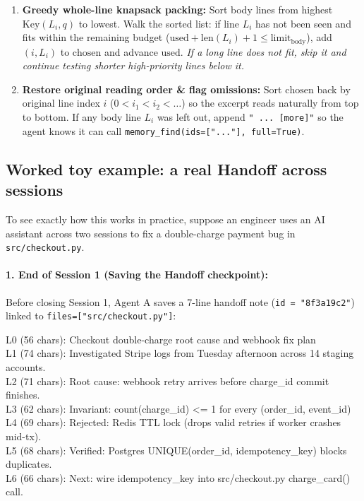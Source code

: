 \documentclass[11pt,a4paper]{article}
\begin{document}
\begin{mathbox}
\begin{enumerate}[leftmargin=1.5em,itemsep=3pt]
\begin{itemize}[leftmargin=1.2em,itemsep=1pt]
  \end{itemize}
  \item \textbf{Greedy whole-line knapsack packing:} Sort body lines from highest $\text{Key}(L_i, q)$ to lowest. Walk the sorted list: if line $L_i$ has not been seen and fits within the remaining budget ($\text{used} + \text{len}(L_i) + 1 \le \text{limit}_{\text{body}}$), add $(i, L_i)$ to $\text{chosen}$ and advance $\text{used}$. \emph{If a long line does not fit, skip it and continue testing shorter high-priority lines below it.}
  \item \textbf{Restore original reading order \& flag omissions:} Sort $\text{chosen}$ back by original line index $i$ ($0 < i_1 < i_2 < \dots$) so the excerpt reads naturally from top to bottom. If any body line $L_i$ was left out, append \texttt{" ... [more]"} so the agent knows it can call \texttt{memory\_find(ids=["..."], full=True)}.
\end{enumerate}
\end{mathbox}

\subsection{Worked toy example: a real Handoff across sessions}

To see exactly how this works in practice, suppose an engineer uses an AI assistant across two sessions to fix a double-charge payment bug in \texttt{src/checkout.py}.

\paragraph{1. End of Session 1 (Saving the Handoff checkpoint):}
Before closing Session 1, Agent A saves a 7-line handoff note (\texttt{id = "8f3a19c2"}) linked to \texttt{files=["src/checkout.py"]}:

\begin{tcolorbox}[colback=codebg,colframe=gray!40,boxrule=0.5pt,arc=3pt,fontupper=\ttfamily\scriptsize]
L0 (56 chars): Checkout double-charge root cause and webhook fix plan\\
L1 (74 chars): Investigated Stripe logs from Tuesday afternoon across 14 staging accounts.\\
L2 (71 chars): Root cause: webhook retry arrives before charge\_id commit finishes.\\
L3 (62 chars): Invariant: count(charge\_id) <= 1 for every (order\_id, event\_id)\\
L4 (69 chars): Rejected: Redis TTL lock (drops valid retries if worker crashes mid-tx).\\
L5 (68 chars): Verified: Postgres UNIQUE(order\_id, idempotency\_key) blocks duplicates.\\
L6 (66 chars): Next: wire idempotency\_key into src/checkout.py charge\_card() call.
\end{tcolorbox}
\end{document}
